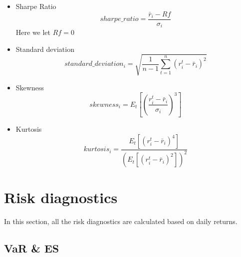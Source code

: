 \documentclass[12pt]{article}
\begin{document}
\begin{itemize}
\item Sharpe Ratio
\begin{equation}
sharpe\_ratio = \frac{\bar{r}_i-Rf}{\sigma_i}
\end{equation}
Here we let $Rf = 0$
\item Standard deviation
\begin{equation}
standard\_deviation_i =\sqrt{ \frac{1}{n-1}\sum_{t=1}^n{(r_i^t-\bar{r}_i)^2}} 
\end{equation}
\item Skewness
\begin{equation}
skewness_i = E_t \left[ \left( \frac{r_i^t-\bar{r}_i}{\sigma_i} \right)^3 \right]
\end{equation}
\item Kurtosis
\begin{equation}
kurtosis_i = \frac{E_t \left[ \left( r_i^t-\bar{r}_i \right)^4 \right]}{\left(E_t \left[ \left( r_i^t-\bar{r}_i \right)^2 \right]\right)^2}
\end{equation}
\end{itemize}




\section{Risk diagnostics}

In this section, all the risk diagnostics are calculated based on daily returns.

\subsection{VaR \& ES}
\end{document}
